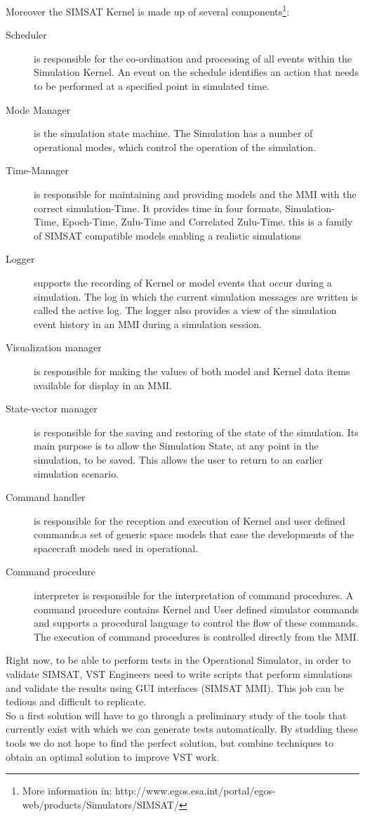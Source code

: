 Moreover the \ac{SIMSAT} Kernel is made up of several components\footnote{More information in: http://www.egos.esa.int/portal/egos-web/products/Simulators/SIMSAT/}:
\begin{description}
\item[Scheduler] is responsible for the co-ordination and processing of all events within the Simulation Kernel. An event on the schedule identifies an action that needs to be performed at a specified point in simulated time.
\item[Mode Manager] is the simulation state machine. The Simulation has a number of operational modes, which control the operation of the simulation.
\item[Time-Manager] is responsible for maintaining and providing models and the \ac{MMI} with the correct simulation-Time. It provides time in four formats, Simulation-Time, Epoch-Time, Zulu-Time and Correlated Zulu-Time. this is a family of SIMSAT compatible models enabling a realistic simulations
\item[Logger] supports the recording of Kernel or model events that occur during a simulation. The log in which the current simulation messages are written is called the active log. The logger also provides a view of the simulation event history in an \ac{MMI} during a simulation session.
\item[Visualization manager] is responsible for making the values of both model and Kernel data items available for display in an \ac{MMI}.
\item[State-vector manager] is responsible for the saving and restoring of the state of the simulation. Its main purpose is to allow the Simulation State, at any point in the simulation, to be saved. This allows the user to return to an earlier simulation scenario.
\item[Command handler] is responsible for the reception and execution of Kernel and user defined commands.a set of generic space models that ease the developments of the spacecraft models used in operational.
\item[Command procedure] interpreter is responsible for the interpretation of command procedures. A command procedure contains Kernel and User defined simulator commands and supports a procedural language to control the flow of these commands. The execution of command procedures is controlled directly from the \ac{MMI}.
\end{description}

Right now, to be able to perform tests in the Operational Simulator, in order to validate \ac{SIMSAT}, \ac{VST} Engineers need to write scripts that
perform simulations and validate the results using GUI interfaces (\ac{SIMSAT} \ac{MMI}). This job can be tedious and difficult to replicate.\\
So a first solution will have to go through a preliminary study of the tools
that currently exist with which we can generate tests automatically.
By studding these tools we do not hope to find the perfect solution, but combine techniques to obtain an optimal solution to improve \ac{VST} work.
